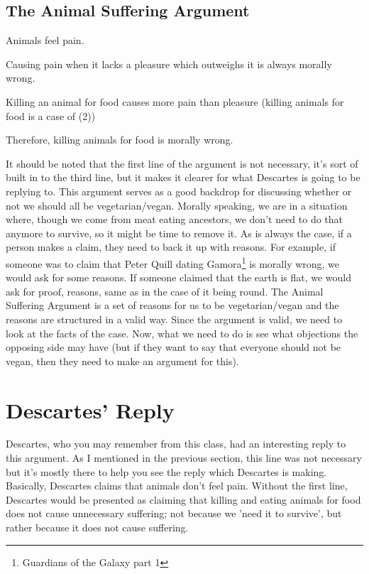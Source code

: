\subsection{The Animal Suffering Argument} 
\begin{earg}
    \item[1] Animals feel pain.
    \item[2] Causing pain when it lacks a pleasure which outweighs it is always morally wrong.
    \item[3] Killing an animal for food causes more pain than pleasure (killing animals for food is a case of (2))
    \item[4] Therefore, killing animals for food is morally wrong.
\end{earg}

It should be noted that the first line of the argument is not necessary, it's sort of built in to the third line, but it makes it clearer for what Descartes is going to be replying to. This argument serves as a good backdrop for discussing whether or not we should all be vegetarian/vegan. Morally speaking, we are in a situation where, though we come from meat eating ancestors, we don't need to do that anymore to survive, so it might be time to remove it.  As is always the case, if a person makes a claim, they need to back it up with reasons. For example, if someone was to claim that Peter Quill dating Gamora\footnote{Guardians of the Galaxy part 1} is morally wrong, we would ask for some reasons. If someone claimed that the earth is flat, we would ask for proof, reasons, same as in the case of it being round.  The Animal Suffering Argument is a set of reasons for us to be vegetarian/vegan and the reasons are structured in a valid way. Since the argument is valid, we need to look at the facts of the case. Now, what we need to do is see what objections the opposing side may have (but if they want to say that everyone should not be vegan, then they need to make an argument for this).

\section{Descartes' Reply}

Descartes, who you may remember from this class, had an interesting reply to this argument. As I mentioned in the previous section, this line was not necessary but it's mostly there to help you see the reply which Descartes is making. Basically, Descartes claims that animals don't feel pain. Without the first line, Descartes would be presented as claiming that killing and eating animals for food does not cause unnecessary suffering; not because we 'need it to survive', but rather because it does not cause suffering.  

